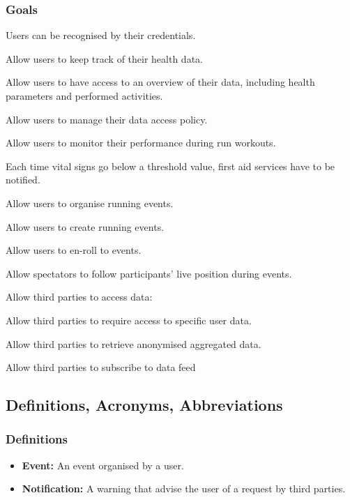 \documentclass{article}
\begin{document}
\subsubsection{Goals} \label{goals}
\begin{enumerate}[label={\textbf{[G\arabic*]}}]
\item Users can be recognised by their credentials. \label{g1}
\item Allow users to keep track of their health data.
\item Allow users to have access to an overview of their data, including health parameters and performed activities. \label{g3}
\item Allow users to manage their data access policy.
\item Allow users to monitor their performance during run workouts.
\item Each time vital signs go below a threshold value, first aid services have to be notified.
\item Allow users to organise running events.
		\begin{enumerate}[label={[G\arabic{enumi}.\arabic*]}]
    		\item Allow users to create running events.
    		\item Allow users to en-roll to events.
    		\item Allow spectators to follow participants’ live position during events.
  		\end{enumerate}
\item Allow third parties to access data:
		\begin{enumerate}[label={[G\arabic{enumi}.\arabic*]}]
    		\item Allow third parties to require access to specific user data.
    		\item Allow third parties to retrieve anonymised aggregated data.
    		\item Allow third parties to subscribe to data feed 
  		\end{enumerate}

\end{enumerate}

\newpage
\subsection{Definitions, Acronyms, Abbreviations}

\subsubsection{Definitions}
\begin{itemize}
	\item \textbf{Event:} An event organised by a user.
	\item \textbf{Notification:} A warning that advise the user of a request by third parties.
	\end{itemize}
\end{document}
